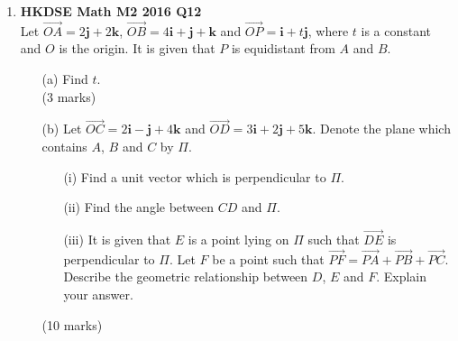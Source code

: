 \documentclass[12pt]{article}
\begin{document}
\begin{enumerate}
	\item \textbf{HKDSE Math M2 2016 Q12}\\
	Let $\overrightarrow{OA} = 2 \textbf{j} +2\textbf {k}$, 
		$\overrightarrow{OB} = 4\textbf{i} + \textbf{j} + \textbf {k}$ and 
		$\overrightarrow{OP} = \textbf{i} +t \textbf{j}$, where $t$ is a constant and $O$ is the origin. It is given that $P$ is equidistant from $A$ and $B$. 
	\begin{enumerate}
		\item [(a)]Find $t$.\\(3 marks)
		\item [(b)]Let $\overrightarrow{OC} = 2 \textbf{i} - \textbf{j} +4\textbf {k}$ and $\overrightarrow{OD} = 3 \textbf{i} +2 \textbf{j} +5\textbf {k}$. Denote the plane which contains $A$, $B$ and $C$ by $\Pi$.
		\begin{enumerate}
			\item [(i)]Find a unit vector which is perpendicular to $\Pi$. 
			\item [(ii)]Find the angle between $CD$ and  $\Pi$. 
			\item [(iii)]It is given that $E$ is a point lying on $\Pi$ such that 
			$\overrightarrow{DE}$ is perpendicular to $\Pi$. Let $F$ be a point such that $\overrightarrow{PF} = \overrightarrow{PA} + \overrightarrow{PB} + \overrightarrow{PC}$. Describe the geometric relationship between $D$, $E$ and $F$. Explain your answer.
		\end{enumerate}
		(10 marks)
	\end{enumerate}
\end{enumerate}
\end{document}
